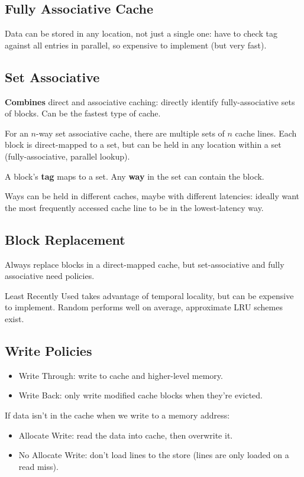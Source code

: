 \documentclass[a4paper,11pt]{article}
\begin{document}
{    \subsection*{Fully Associative Cache}
    {
        Data can be stored in any location, not just a single one: have to check tag against all entries in parallel, so expensive to implement (but very fast).
    }
    \subsection*{Set Associative}
    {
        \textbf{Combines} direct and associative caching: directly identify fully-associative sets of blocks. Can be the fastest type of cache.

        For an \(n\)-way set associative cache, there are multiple sets of \(n\) cache lines. Each block is direct-mapped to a set, but can be held in any location within a set (fully-associative, parallel lookup).

        A block's \textbf{tag} maps to a set. Any \textbf{way} in the set can contain the block.

        Ways can be held in different caches, maybe with different latencies: ideally want the most frequently accessed cache line to be in the lowest-latency way.
    }
    \subsection*{Block Replacement}
    {
        Always replace blocks in a direct-mapped cache, but set-associative and fully associative need policies.

        Least Recently Used takes advantage of temporal locality, but can be expensive to implement. Random performs well on average, approximate LRU schemes exist.
    }
    \subsection*{Write Policies}
    {
        \begin{itemize}
        \item Write Through: write to cache and higher-level memory.
        \item Write Back: only write modified cache blocks when they're evicted.
        \end{itemize}

        If data isn't in the cache when we write to a memory address:
        \begin{itemize}
        \item Allocate Write: read the data into cache, then overwrite it.
        \item No Allocate Write: don't load lines to the store (lines are only loaded on a read miss).
        \end{itemize}

}}
\end{document}
